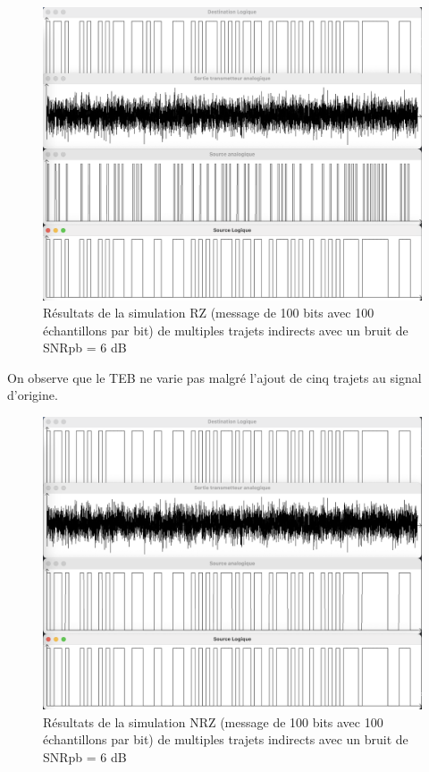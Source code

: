 \begin{figure}[H]
    \centering
    \includegraphics[width=\textwidth]{img/etape4b_ti_multiples_et_bruit_6_RZ.png}
    \caption{Résultats de la simulation RZ (message de 100 bits avec 100 échantillons par bit) de multiples trajets indirects  avec un bruit de SNRpb = 6 dB}
    \label{fig:etape4b_ti_multiples_et_bruit_6_RZ}
\end{figure}

On observe que le TEB ne varie pas malgré l'ajout de cinq trajets au signal d'origine.

\begin{figure}[H]
    \centering
    \includegraphics[width=\textwidth]{img/etape4b_ti_multiples_et_bruit_6_NRZ.png}
    \caption{Résultats de la simulation NRZ (message de 100 bits avec 100 échantillons par bit) de multiples trajets indirects avec un bruit de SNRpb = 6 dB}
    \label{fig:etape4b_ti_multiples_et_bruit_6_NRZ}
\end{figure}

